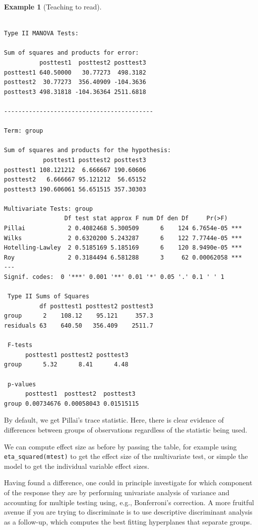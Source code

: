 \documentclass[
  11pt,
  letterpaper,
]{scrbook}
\theoremstyle{definition}
\theoremstyle{definition}
\newtheorem{example}{Example}[chapter]
\theoremstyle{remark}
\begin{document}
\begin{example}[Teaching to
read]
\begin{verbatim}

Type II MANOVA Tests:

Sum of squares and products for error:
          posttest1  posttest2 posttest3
posttest1 640.50000   30.77273  498.3182
posttest2  30.77273  356.40909 -104.3636
posttest3 498.31818 -104.36364 2511.6818

------------------------------------------
 
Term: group 

Sum of squares and products for the hypothesis:
           posttest1 posttest2 posttest3
posttest1 108.121212  6.666667 190.60606
posttest2   6.666667 95.121212  56.65152
posttest3 190.606061 56.651515 357.30303

Multivariate Tests: group
                 Df test stat approx F num Df den Df     Pr(>F)    
Pillai            2 0.4082468 5.300509      6    124 6.7654e-05 ***
Wilks             2 0.6320200 5.243287      6    122 7.7744e-05 ***
Hotelling-Lawley  2 0.5185169 5.185169      6    120 8.9490e-05 ***
Roy               2 0.3184494 6.581288      3     62 0.00062058 ***
---
Signif. codes:  0 '***' 0.001 '**' 0.01 '*' 0.05 '.' 0.1 ' ' 1

 Type II Sums of Squares
          df posttest1 posttest2 posttest3
group      2    108.12    95.121     357.3
residuals 63    640.50   356.409    2511.7

 F-tests
      posttest1 posttest2 posttest3
group      5.32      8.41      4.48

 p-values
      posttest1  posttest2  posttest3 
group 0.00734676 0.00058043 0.01515115
\end{verbatim}

By default, we get Pillai's trace statistic. Here, there is clear
evidence of differences between groups of observations regardless of the
statistic being used.

We can compute effect size as before by passing the table, for example
using \texttt{eta\_squared(mtest)} to get the effect size of the
multivariate test, or simple the model to get the individual variable
effect sizes.

Having found a difference, one could in principle investigate for which
component of the response they are by performing univariate analysis of
variance and accounting for multiple testing using, e.g., Bonferroni's
correction. A more fruitful avenue if you are trying to discriminate is
to use descriptive discriminant analysis as a follow-up, which computes
the best fitting hyperplanes that separate groups.


\end{example}
\end{document}
